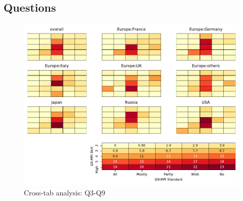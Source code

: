 
\subsection{Questions}


\begin{figure}
\begin{center}
\includegraphics[width=12cm]{../pdfs/Q3-Q9.pdf}
\caption{Cross-tab analysis: Q3-Q9}
\label{fig:Q3-Q9}
\end{center}
\end{figure}
